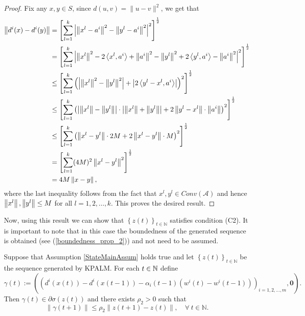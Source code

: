 \begin{proof}
Fix any $x,y \in S$, since $d(u,v) = \| u-v \|^2$, we get that
\begin{align*} 
	\left\Vert {d^i(x)  - d^i(y)} \right\Vert 
	&= \left[ \sum\limits_{l=1}^{k} \left\lvert \left\Vert {x^l - a^i} \right\Vert^2 - \left\Vert { y^l -a^i} \right\Vert^2 \right\rvert^2 \right]^{\frac{1}{2}} \\
	&= \left[ \sum\limits_{l=1}^{k} \left\lvert \left\Vert {x^l} \right\Vert^2 - 2\left\langle x^l,a^i \right\rangle + \left\Vert {a^i} \right\Vert^2 - \left\Vert {y^l} \right\Vert^2 + 2\left\langle y^l,a^i \right\rangle - \left\Vert {a^i} \right\Vert^2 \right\rvert ^2 \right]^{\frac{1}{2}} \\ 
	&\leq \left[ \sum\limits_{l=1}^{k} \left( \left\lvert \left\Vert {x^l} \right\Vert^2 - \left\Vert {y^l} \right\Vert^2 \right\rvert + \left\lvert 2\left\langle y^l - x^l , a^i \right\rangle \right\rvert \right)^2 \right]^{\frac{1}{2}} \\ 
	&\leq \left[ \sum\limits_{l=1}^{k} \left( \left\lvert \left\Vert {x^l} \right\Vert - \left\Vert {y^l} \right\Vert \right\rvert \cdot \left\lvert \left\Vert {x^l} \right\Vert + \left\Vert {y^l} \right\Vert \right\rvert + 2 \left\Vert {y^l - x^l} \right\Vert \cdot \left\Vert {a^i} \right\Vert \right)^2 \right]^{\frac{1}{2}} \\
	&\leq \left[ \sum\limits_{l=1}^{k} \left( \left\Vert {x^l - y^l} \right\Vert \cdot 2M + 2 \left\Vert {x^l - y^l} \right\Vert\cdot M \right)^2 \right]^{\frac{1}{2}} \\
	&= \left[ \sum\limits_{l=1}^{k} (4M)^2 \left\Vert {x^l - y^l} \right\Vert^2 \right]^{\frac{1}{2}} \\
	&= 4M \left\Vert {x - y} \right\Vert ,
\end{align*}
where the last inequality follows from the fact that $x^l,y^l \in Conv(\mathcal{A})$ and hence $\left\Vert {x^l} \right\Vert,\left\Vert {y^l} \right\Vert \leq M$ for all $l=1,2,\ldots,k$. This proves the desired result.
\end{proof}

Now, using this result we can show that $\left\lbrace z(t) \right\rbrace_{t \in \mathbb{N}}$ satisfies condition (C2). It is important to note that in this case the boundedness of the generated sequence is obtained (see (\ref{boundedness_prop_2})) and not need to be assumed.

\begin{proposition} \label{State_KPALM_SGP}
Suppose that Assumption \ref{StateMainAssum} holds true and let $\left\lbrace z(t) \right\rbrace_{t \in \mathbb{N}}$ be the sequence generated by KPALM.
For each $t \in \mathbb{N}$ define 
\begin{equation*}
	\gamma(t) := \left( \left( d^i(x(t)) - d^i(x(t-1)) - \alpha_i(t-1)(w^i(t) - w^i(t-1)) \right)_{i=1,2, \ldots, m}, \mathbf{0} \right).
\end{equation*}
Then $\gamma(t) \in \partial \sigma(z(t))$ and there exists $\rho_2 > 0$ such that 
\begin{equation*}
	\| \gamma(t+1)\| \leq \rho_2 \|z(t+1) - z(t)\|, \quad \forall \: t \in \mathbb{N} .
\end{equation*}
\end{proposition}

